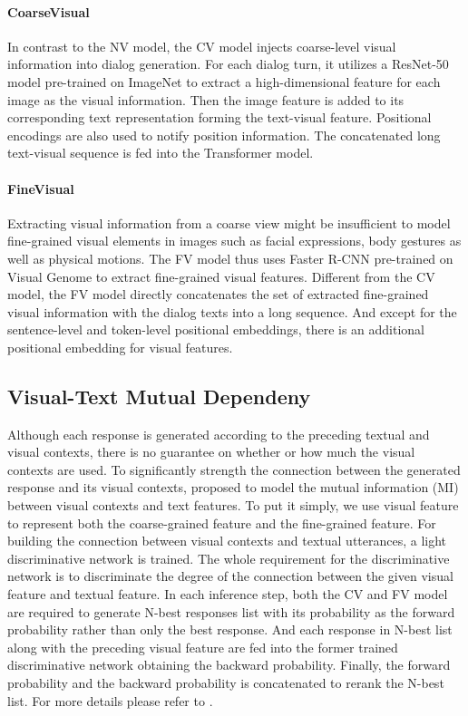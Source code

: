 \documentclass[11pt,a4paper]{article}
\begin{document}
\paragraph{CoarseVisual} In contrast to the NV model, the CV model injects coarse-level visual information into dialog generation. For each dialog turn, it utilizes a ResNet-50 model \cite{kaiming2016resnet} pre-trained on ImageNet \cite{krizhevsky2012imagenet} to extract a high-dimensional feature for each image as the visual information. Then the image feature is added to its corresponding text representation forming the text-visual feature. Positional encodings are also used to notify position information. The concatenated long text-visual sequence is fed into the Transformer model.

\paragraph{FineVisual} Extracting visual information from a coarse view might be insufficient to model fine-grained visual elements in images such as facial expressions, body gestures as well as physical motions. The FV model thus uses Faster R-CNN \cite{ren2015faster} pre-trained on Visual Genome \cite{krishna2017visual} to extract fine-grained visual features. Different from the CV model, the FV model directly concatenates the set of extracted fine-grained visual information with the dialog texts into a long sequence. And except for  the sentence-level and token-level positional embeddings, there is an additional positional embedding for visual features. 

\subsection{Visual-Text Mutual Dependeny}
Although each response is generated according to the preceding textual and visual contexts, there is no guarantee on whether or how much the visual contexts are used. To significantly strength the connection between the generated response and its visual contexts, \citet{wang2021modeling} proposed to model the mutual information (MI) between visual contexts and text features. To put it simply, we use visual feature to represent both the coarse-grained feature and the fine-grained feature. For building the connection between visual contexts and textual utterances, a light discriminative network is trained. The whole requirement for the discriminative network is to discriminate the degree of the connection between the given visual feature and textual feature. In each inference step, both the CV and FV model are required to generate N-best responses list with its probability as the forward probability rather than only the best response. And each response in N-best list along with the preceding visual feature are fed into the former trained discriminative network obtaining the backward probability. Finally, the forward probability and the backward probability is concatenated to rerank the N-best list. For more details please refer to \citet{wang2021modeling}.
\end{document}
